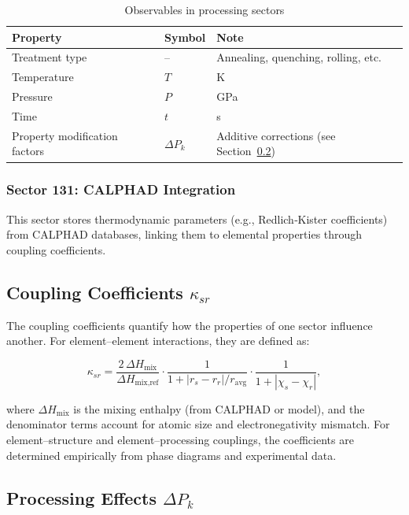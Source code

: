\documentclass[12pt,a4paper]{article}
\begin{document}
	\begin{table}[htbp]
		\centering
		\caption{Observables in processing sectors}
		\label{tab:proc-obs}
		\begin{tabular}{p{4cm}p{3cm}p{6cm}}
			\toprule
			\textbf{Property} & \textbf{Symbol} & \textbf{Note} \\
			\midrule
			Treatment type & – & Annealing, quenching, rolling, etc. \\
			Temperature & \(T\) & K \\
			Pressure & \(P\) & GPa \\
			Time & \(t\) & s \\
			Property modification factors & \(\Delta P_k\) & Additive corrections (see Section~\ref{sec:processing}) \\
			\bottomrule
		\end{tabular}
	\end{table}
	
	\subsubsection{Sector 131: CALPHAD Integration}
	
	This sector stores thermodynamic parameters (e.g., Redlich‑Kister coefficients) from CALPHAD databases, linking them to elemental properties through coupling coefficients.
	
	\subsection{Coupling Coefficients \(\kappa_{sr}\)}
	
	The coupling coefficients quantify how the properties of one sector influence another. For element–element interactions, they are defined as:
	
	\[
	\kappa_{sr} = \frac{2\,\Delta H_{\text{mix}}}{\Delta H_{\text{mix,ref}}} \cdot
	\frac{1}{1 + |r_s - r_r|/r_{\text{avg}}} \cdot
	\frac{1}{1 + |\chi_s - \chi_r|},
	\]
	
	where \(\Delta H_{\text{mix}}\) is the mixing enthalpy (from CALPHAD or model), and the denominator terms account for atomic size and electronegativity mismatch. For element–structure and element–processing couplings, the coefficients are determined empirically from phase diagrams and experimental data.
	
	\subsection{Processing Effects \(\Delta P_k\)}
	\label{sec:processing}
	
\end{document}
